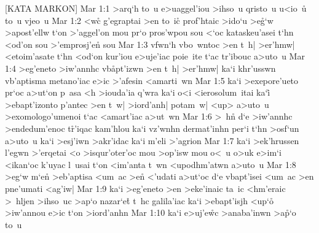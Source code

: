 [KATA MARKON]
\vs Mar 1:1
>arq`h
to~u
e>uaggel'iou
>ihso~u
qristo~u
u<io~u\r{}
to~u
vjeo~u\bibvsend
\vs Mar 1:2
<w\r{c}
g'egraptai
>en
to~ic\r{}
prof'htaic
>ido`u
>e\r{g}`w
>apost'ellw
t`on
>'aggel'on
mou
pr`o
pros'wpou
sou
<`oc
kataskeu'asei
t`hn
<od'on
sou
>'emprosj'en\r{}
sou\bibvsend
\vs Mar 1:3
vfwn`h
vbo~wntoc
>en
t~h|
>er'hmw|
<etoim'asate
t`hn
<od`on
kur'iou
e>uje'iac
poie~ite
t`ac
tr'ibouc
a>uto~u\bibvsend
\vs Mar 1:4
>eg'eneto
>iw'annhc
vb\r{a}pt'izwn
>en
t~h|
>er'hmw|
ka`i
khr'usswn
vb'aptisma
metano'iac
e>ic
>'afesin
<amarti~wn\bibvsend
\vs Mar 1:5
ka`i
>exepore'ueto
pr`oc
a>ut`on
p~asa
<h
>iouda'ia
q'wra
ka`i
o<i
<ierosolum~itai
ka`i\r{}
>ebapt'izonto
p'antec
>en
t~w|
>iord'anh|
potam~w|
<up>
a>uto~u
>exomologo'umenoi
t`ac
<amart'iac
a>ut~wn\bibvsend
\vs Mar 1:6
>~hn\r{}
d`e
>iw'annhc
>endedum'enoc
t\r{r}'iqac
kam'hlou
ka`i
vz'wnhn
dermat'inhn
per`i
t`hn
>osf`un
a>uto~u
ka`i
>esj'iwn
>akr'idac
ka`i
m'eli
>'agrion\bibvsend
\vs Mar 1:7
ka`i
>ek'hrussen
l'egwn
>'erqetai
<o
>isqur'oter'oc
mou
>op'isw
mou
o<~u
o>uk
e>im`i
<ikan`oc
k'uyac
l~usai
t`on
<im'anta
t~wn
<upodhm'atwn
a>uto~u\bibvsend
\vs Mar 1:8
>eg`w
m`e\r{n}
>eb'aptisa
<um~ac
>e\r{n}
<'udati
a>ut`oc
d`e
vbapt'isei
<um~ac
>en
pne'umati
<ag'iw|\bibvsend
\vs Mar 1:9
ka`i
>eg'eneto
>en
>eke'inaic
ta~ic
<hm'eraic
>~hljen
>ihso~uc
>ap`o
nazar`e\r{t}
t~hc
galila'iac
ka`i
>ebapt'isjh
<up`o\r{}
>iw'annou
e>ic
t`on
>iord'anhn\bibvsend
\vs Mar 1:10
ka`i
e>uj'e\r{w}c
>anaba'inwn
>a\r{p}`o
to~u

